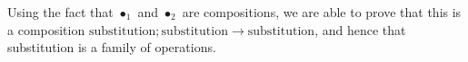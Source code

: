 Using the fact that $\bullet_1$ and $\bullet_2$ are compositions, we are
able to prove that this is a composition $\mathrm{substitution} ; \mathrm{substitution} \rightarrow \mathrm{substitution}$, and hence that substitution is a family of operations.

\begin{code}%
\> \AgdaSymbol{:}  \AgdaSymbol{\{}\AgdaSymbol{\}} \AgdaSymbol{\{}\AgdaSymbol{\}} \AgdaSymbol{\{}\AgdaSymbol{\}} \AgdaSymbol{\{} \AgdaSymbol{:}   \AgdaSymbol{\}} \AgdaSymbol{\{} \AgdaSymbol{:}   \AgdaSymbol{\}} \AgdaSymbol{\{}\AgdaSymbol{\}}  \<[60]%
\>[60]\<%
\\
\>[0]\<[2]%
\>[2]  \AgdaSymbol{(}  \AgdaSymbol{)}        \<%
\end{code}

